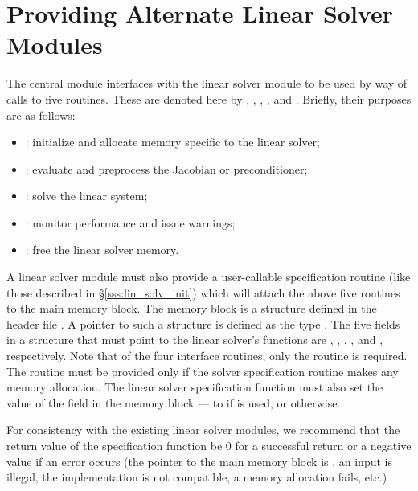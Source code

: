 \chapter{Providing Alternate Linear Solver Modules}\label{s:new_linsolv}
The central {\ida} module interfaces with the linear solver module to be
used by way of calls to five routines.  These are denoted here by 
, , , , and .
Briefly, their purposes are as follows:
\begin{itemize}
\item {}: initialize and allocate memory specific to the
  linear solver;
\item {}: evaluate and preprocess the Jacobian or preconditioner;
\item {}: solve the linear system;
\item {}: monitor performance and issue warnings;
\item {}: free the linear solver memory.
\end{itemize}
A linear solver module must also provide a user-callable specification routine
(like those described in \S\ref{sss:lin_solv_init}) which will attach
the above five routines to the main {\ida} memory block. 
The {\ida} memory block is a structure defined in the header file . 
A pointer to such a structure is defined as the type . 
The five fields in a  structure that must point to the linear solver's 
functions are , , , , 
and , respectively.
Note that of the four interface routines, only the  routine is required. 
The  routine must be provided only if the solver specification routine
makes any memory allocation.
The linear solver specification function must also set the value of
the field  in the {\ida} memory block --- to
 if  is used, or  otherwise.

For consistency with the existing {\ida} linear solver modules, we
recommend that the return value of the specification function be 0 for
a successful return or a negative value if an error occurs (the
pointer to the main {\ida} memory block is , an input is
illegal, the {\nvector} implementation is not compatible, a memory
allocation fails, etc.)

